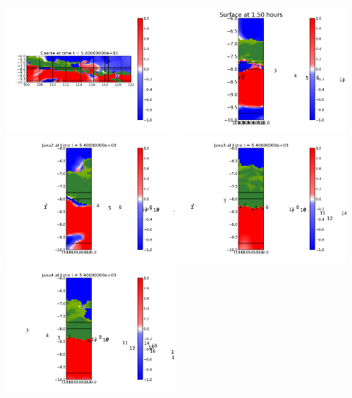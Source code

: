 \documentclass[11pt]{article}
\begin{document}
\vskip 10pt 
\includegraphics[width=0.475\textwidth]{frame0006fig0.png}
\includegraphics[width=0.475\textwidth]{frame0006fig15.png}
\vskip 10pt 
\includegraphics[width=0.475\textwidth]{frame0006fig25.png}
\includegraphics[width=0.475\textwidth]{frame0006fig20.png}
\vskip 10pt 
\includegraphics[width=0.475\textwidth]{frame0006fig30.png}
\end{document}
